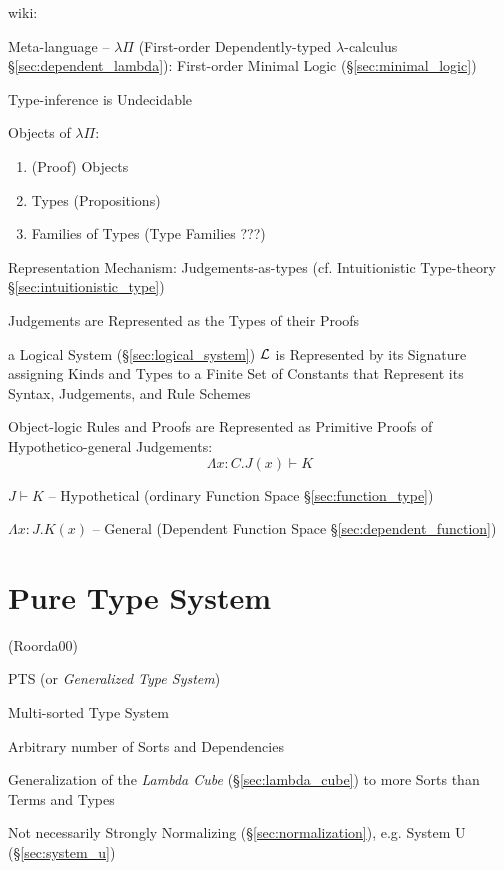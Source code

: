 wiki:

Meta-language -- $\lambda\Pi$ (First-order Dependently-typed
$\lambda$-calculus \S\ref{sec:dependent_lambda}): First-order Minimal
Logic (\S\ref{sec:minimal_logic})

\fist Type-inference is Undecidable %

Objects of $\lambda\Pi$:
\begin{enumerate}
  \item (Proof) Objects
  \item Types (Propositions)
  \item Families of Types (Type Families ???)
\end{enumerate}

Representation Mechanism: Judgements-as-types (cf. Intuitionistic
Type-theory \S\ref{sec:intuitionistic_type})

Judgements are Represented as the Types of their Proofs

a Logical System (\S\ref{sec:logical_system}) $\mathcal{L}$ is
Represented by its Signature assigning Kinds and Types to a Finite Set
of Constants that Represent its Syntax, Judgements, and Rule Schemes

Object-logic Rules and Proofs are Represented as Primitive Proofs of
Hypothetico-general Judgements:
\[
  \Lambda x:C.J(x) \vdash K
\]

$J \vdash K$ -- Hypothetical (ordinary Function Space
\S\ref{sec:function_type})

$\Lambda x:J.K(x)$ -- General (Dependent Function Space
\S\ref{sec:dependent_function})



\section{Pure Type System}\label{sec:pts}

(Roorda00) %

PTS (or \emph{Generalized Type System})

Multi-sorted Type System

Arbitrary number of Sorts and Dependencies

Generalization of the \emph{Lambda Cube} (\S\ref{sec:lambda_cube}) to
more Sorts than Terms and Types

Not necessarily Strongly Normalizing (\S\ref{sec:normalization}), e.g.
System U (\S\ref{sec:system_u})

